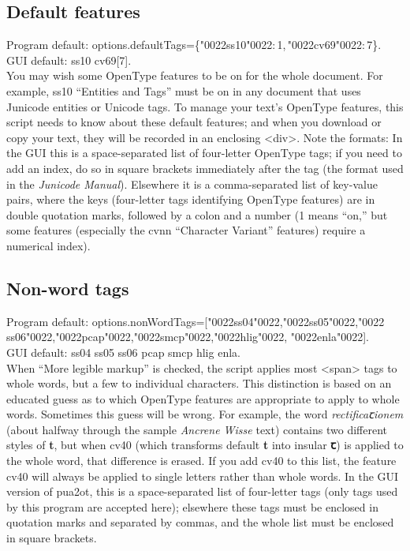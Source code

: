 \documentclass[12pt,letterpaper,openany]{article}
\newcommand\textSourceText[1]{{\color{GGOrange}\textsf{#1}}}
\newcommand\textex[1]{\textrm{\textbf{\color{BrickRed}#1}}}
\newcommand{\pto}{\textsf{\color{myLightPurple}pua2ot}}
\begin{document}
\subsection{Default features}

Program default: \textSourceText{options.defaultTags=\{\char"0022ss10\char"0022:\,1,\,\char"0022cv69\char"0022:\,7\}}.\\
GUI default: \textSourceText{ss10 cv69[7]}.\\
You may wish some OpenType features to be on for the whole document. For example, 
\textSourceText{ss10} “Entities and Tags” must be on in any document that uses Junicode entities or 
Unicode tags. To manage 
your text’s OpenType features, this script needs to know about these default features; 
and when you download or copy your text, they will be recorded in an enclosing {\textless}div{\textgreater}. 
Note the formats: In the GUI this is a space-separated list of four-letter OpenType tags; if you need 
to add an index, do so in square brackets immediately after the tag (the format used in the
\textit{Junicode Manual}). Elsewhere it is a comma-separated list of key-value pairs, where the keys 
(four-letter tags identifying OpenType features) are in double quotation marks, followed 
by a colon and a number (1 means “on,” but some features (especially the \textSourceText{cvnn} 
“Character Variant” features) require a numerical index).

\subsection{Non-word tags}

Program default: \textSourceText{options.nonWordTags=[\char"0022ss04\char"0022,\char"0022ss05\char"0022,\char"0022%
ss06\char"0022,\char"0022pcap\char"0022,\char"0022smcp\char"0022,\char"0022hlig\char"0022,%
\char"0022enla\char"0022]}.\\
GUI default: \textSourceText{ss04 ss05 ss06 pcap smcp hlig enla}.\\
When “More legible markup” 
is checked, the script applies most <span> tags to whole words, but 
a few to individual characters. This distinction is based on an educated guess as to which OpenType 
features are appropriate to apply to whole words. Sometimes this guess will be wrong. For example, the 
word \textit{rectificaꞇionem} (about halfway through the sample \textit{Ancrene Wisse} text) contains two different 
styles of \textex{t}, but when \textSourceText{cv40} (which transforms default \textex{t} into insular 
\textex{ꞇ}) is applied to the whole word, 
that difference is erased. If you add \textSourceText{cv40} to this list, the feature \textSourceText{cv40} 
will always be applied to single letters rather than whole words. In the GUI version of {\pto},
this is a space-separated list of four-letter tags (only tags used by this program are accepted here);
elsewhere these tags must be enclosed in 
quotation marks and separated by commas, and the whole list must be enclosed in square brackets.
\end{document}
